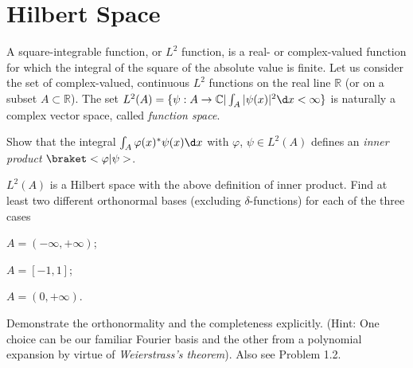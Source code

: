 
\section{Hilbert Space}

\begin{problem}
  A square-integrable function, or $L^2$ function, is a real- or complex-valued
  function for which the integral of the square of the absolute value is finite.
  Let us consider the set of complex-valued, continuous $L^2$ functions on the real line $\mathbb R$ (or on a subset $A \subset \mathbb R$).
  The set $L^2(A) = \{\psi: A \to \mathbb C | \int_A |\psi(x)|^2 \d x < \infty\}$
  is naturally a complex vector space, called \emph{function space}.
  \begin{enumext}
    \item Show that the integral $\int_A \varphi(x)^* \psi(x) \d x$
    with $\varphi$, $\psi \in L^2(A)$ defines an \emph{inner product}
    $\braket<\varphi|\psi>$.
    \item $L^2(A)$ is a Hilbert space with the above definition of inner product.
    Find at least two different orthonormal bases (excluding $\delta$-functions)
    for each of the three cases
    \begin{enumext}[columns = 3]
      \item $A = (-\infty, +\infty)$;
      \item $A = [-1, 1]$;
      \item $A = (0, +\infty)$.
    \end{enumext}
    Demonstrate the orthonormality and the completeness explicitly.
    (Hint: One choice can be our familiar Fourier basis
    and the other from a polynomial expansion by virtue of
    \emph{Weierstrass's theorem}). Also see Problem 1.2.
  \end{enumext}
\end{problem}
